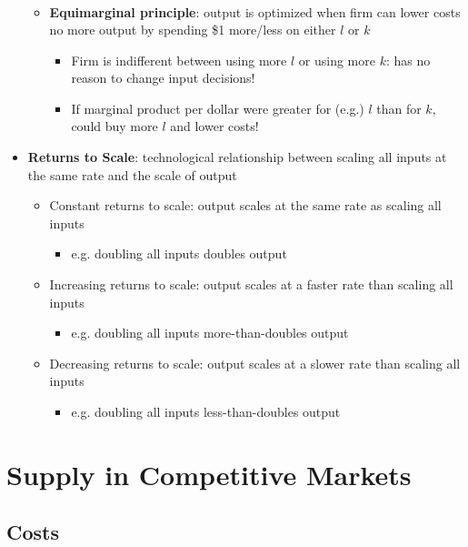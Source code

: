 \documentclass{article}
\begin{document}
\begin{itemize}
\begin{itemize}
\begin{itemize}
\begin{align*}
		\end{align*}
		\end{itemize}
	\item \textbf{Equimarginal principle}: output is optimized when firm can lower costs no more output by spending \$1 more/less on either $l$ or $k$
	\begin{itemize}
		\item Firm is indifferent between using more $l$ or using more $k$: has no reason to change input decisions! 
		\item If marginal product per dollar were greater for (e.g.) $l$ than for $k$, could buy more $l$ and lower costs! 
	\end{itemize}
	\end{itemize} 
	\item \textbf{Returns to Scale}: technological relationship between scaling all inputs at the same rate and the scale of output
	\begin{itemize}
		\item Constant returns to scale: output scales at the same rate as scaling all inputs
		\begin{itemize}
			\item e.g. doubling all inputs doubles output
		\end{itemize}
		\item Increasing returns to scale: output scales at a faster rate than scaling all inputs 
		\begin{itemize}
			\item e.g. doubling all inputs more-than-doubles output
		\end{itemize}
		\item Decreasing returns to scale: output scales at a slower rate than scaling all inputs 
		\begin{itemize}
			\item e.g. doubling all inputs less-than-doubles output
		\end{itemize}
\end{itemize}
\end{itemize}

\clearpage 
\section*{Supply in Competitive Markets}

\subsection*{Costs}
\end{document}
